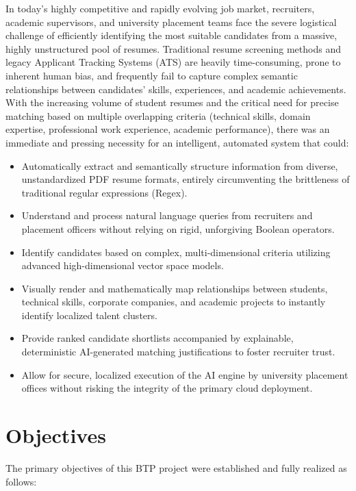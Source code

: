 \documentclass[12pt,a4paper]{report}
\begin{document}
In today's highly competitive and rapidly evolving job market, recruiters, academic supervisors, and university placement teams face the severe logistical challenge of efficiently identifying the most suitable candidates from a massive, highly unstructured pool of resumes. Traditional resume screening methods and legacy Applicant Tracking Systems (ATS) are heavily time-consuming, prone to inherent human bias, and frequently fail to capture complex semantic relationships between candidates' skills, experiences, and academic achievements. With the increasing volume of student resumes and the critical need for precise matching based on multiple overlapping criteria (technical skills, domain expertise, professional work experience, academic performance), there was an immediate and pressing necessity for an intelligent, automated system that could:

\begin{itemize}
    \item Automatically extract and semantically structure information from diverse, unstandardized PDF resume formats, entirely circumventing the brittleness of traditional regular expressions (Regex).
    \item Understand and process natural language queries from recruiters and placement officers without relying on rigid, unforgiving Boolean operators.
    \item Identify candidates based on complex, multi-dimensional criteria utilizing advanced high-dimensional vector space models.
    \item Visually render and mathematically map relationships between students, technical skills, corporate companies, and academic projects to instantly identify localized talent clusters.
    \item Provide ranked candidate shortlists accompanied by explainable, deterministic AI-generated matching justifications to foster recruiter trust.
    \item Allow for secure, localized execution of the AI engine by university placement offices without risking the integrity of the primary cloud deployment.
\end{itemize}

\section{Objectives}

The primary objectives of this BTP project were established and fully realized as follows:
\end{document}
